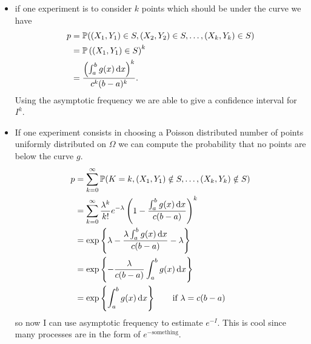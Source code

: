 \documentclass[12pt]{report}
\begin{document}
\begin{itemize}
	\item if one experiment is to consider $k$ points which should be under the curve we have
	\begin{align*}
		p&=\mathbb{P}((X_1,Y_1)\in S,(X_2,Y_2)\in S,\ldots,(X_k,Y_k)\in S)\\
		&=\mathbb{P}\left((X_1,Y_1)\in S\right)^{k}\\
		&=\frac{\left(\int_{a}^{b}g(x)\mathop{}\!\mathrm{d} x\right)^{k}}{c^{k}(b-a)^{k}}.
	\end{align*}
	Using the asymptotic frequency we are able to give a confidence interval for $I^{k}$. 
	\item If one experiment consists in choosing a Poisson distributed number of points uniformly distributed on $\Omega$ we can compute the probability that no points are below the curve $g$.
	\begin{align*}
		p&=\sum_{k=0}^{\infty}\mathbb{P}(K=k,(X_1,Y_1)\notin S,\ldots,(X_k,Y_k)\notin S)\\
		&=\sum_{k=0}^{\infty}\frac{\lambda^{k}}{k!}e^{-\lambda}\left(1-\frac{\int_{a}^{b}g(x)\mathop{}\!\mathrm{d} x}{c(b-a)}\right)^{k}\\
		&=\exp\left\{\lambda-\frac{\lambda\int_{a}^{b}g(x)\mathop{}\!\mathrm{d} x}{c(b-a)}-\lambda\right\}\\
		&=\exp\left\{-\frac{\lambda}{c(b-a)}\int_{a}^{b}g(x)\mathop{}\!\mathrm{d} x\right\}\\
		&=\exp\left\{\int_{a}^{b}g(x)\mathop{}\!\mathrm{d} x\right\}\qquad\text{if }\lambda=c(b-a)
	\end{align*}
	so now I can use asymptotic frequency to estimate $e^{-I}$. This is cool since many processes are in the form of $e^{-\text{something}}$. 
\end{itemize}
\end{document}
